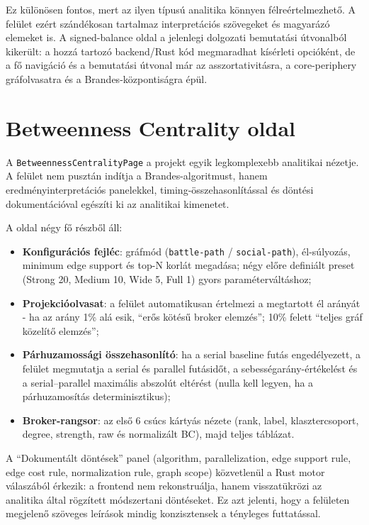 ﻿\documentclass[a4paper,12pt]{report}
\begin{document}
Ez különösen fontos, mert az ilyen típusú analitika könnyen félreértelmezhető. A felület ezért szándékosan tartalmaz interpretációs szövegeket és magyarázó elemeket is. A signed-balance oldal a jelenlegi dolgozati bemutatási útvonalból kikerült: a hozzá tartozó backend/Rust kód megmaradhat kísérleti opcióként, de a fő navigáció és a bemutatási útvonal már az asszortativitásra, a core-periphery gráfolvasatra és a Brandes-központiságra épül.

\section{Betweenness Centrality oldal}

A \texttt{BetweennessCentralityPage} a projekt egyik legkomplexebb analitikai nézetje. A felület nem pusztán indítja a Brandes-algoritmust, hanem eredményinterpretációs panelekkel, timing-összehasonlítással és döntési dokumentációval egészíti ki az analitikai kimenetet.

A oldal négy fő részből áll:

\begin{itemize}
    \item \textbf{Konfigurációs fejléc}: gráfmód (\texttt{battle-path} / \texttt{social-path}), él-súlyozás, minimum edge support és top-N korlát megadása; négy előre definiált preset (Strong 20, Medium 10, Wide 5, Full 1) gyors paraméterváltáshoz;
    \item \textbf{Projekcióolvasat}: a felület automatikusan értelmezi a megtartott él arányát - ha az arány 1\% alá esik, ``erős kötésű broker elemzés''; 10\% felett ``teljes gráf közelítő elemzés'';
    \item \textbf{Párhuzamossági összehasonlító}: ha a serial baseline futás engedélyezett, a felület megmutatja a serial és parallel futásidőt, a sebességarány-értékelést és a serial--parallel maximális abszolút eltérést (nulla kell legyen, ha a párhuzamosítás determinisztikus);
    \item \textbf{Broker-rangsor}: az első 6 csúcs kártyás nézete (rank, label, klasztercsoport, degree, strength, raw és normalizált BC), majd teljes táblázat.
\end{itemize}

A ``Dokumentált döntések'' panel (algorithm, parallelization, edge support rule, edge cost rule, normalization rule, graph scope) közvetlenül a Rust motor válaszából érkezik: a frontend nem rekonstruálja, hanem visszatükrözi az analitika által rögzített módszertani döntéseket. Ez azt jelenti, hogy a felületen megjelenő szöveges leírások mindig konzisztensek a tényleges futtatással.
\end{document}
